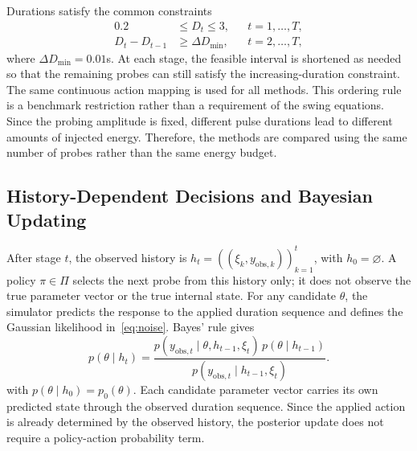 \documentclass[conference,letterpaper]{IEEEtran}
\begin{document}
Durations satisfy the common constraints
\begin{equation}
\begin{aligned}
0.2&\le D_t\le3,&&t=1,\ldots,T,\\
D_t-D_{t-1}&\ge\Delta D_{\min},&&t=2,\ldots,T,
\end{aligned}\label{eq:bounds}
\end{equation}
where $\Delta D_{\min}=0.01$s. At each stage, the feasible interval is shortened as needed so that the remaining probes can still satisfy the increasing-duration constraint. The same continuous action mapping is used for all methods. This ordering rule is a benchmark restriction rather than a requirement of the swing equations. Since the probing amplitude is fixed, different pulse durations lead to different amounts of injected energy. Therefore, the methods are compared using the same number of probes rather than the same energy budget.




\subsection{History-Dependent Decisions and Bayesian Updating}
After stage $t$, the observed history is $h_t=((\xi_k,y_{\mathrm{obs},k}))_{k=1}^t$, with $h_0=\varnothing$. A policy $\pi\in\Pi$ selects the next probe from this history only; it does not observe the true parameter vector or the true internal state. For any candidate $\theta$, the simulator predicts the response to the applied duration sequence and defines the Gaussian likelihood in~\eqref{eq:noise}. Bayes' rule gives
\begin{equation}
p(\theta\mid h_t)=
\frac{p(y_{\mathrm{obs},t}\mid\theta,h_{t-1},\xi_t)\,p(\theta\mid h_{t-1})}
{p(y_{\mathrm{obs},t}\mid h_{t-1},\xi_t)}.\label{eq:posterior}
\end{equation}
with $p(\theta\mid h_0)=p_0(\theta)$. Each candidate parameter vector carries its own predicted state through the observed duration sequence. Since the applied action is already determined by the observed history, the posterior update does not require a policy-action probability term.
\end{document}
